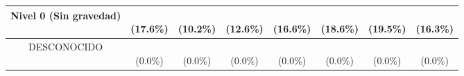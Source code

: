 \begin{table}[htbp]
\begin{tabular}{|c|c|c|c|c|c|c|c|}
\parbox[t]{4.0cm}{\raggedright Nivel 0 (Sin gravedad)} & \parbox[t]{1.2cm}{\\(17.6\%)} & \parbox[t]{1.2cm}{\\(10.2\%)} & \parbox[t]{1.2cm}{\\(12.6\%)} & \parbox[t]{1.2cm}{\\(16.6\%)} & \parbox[t]{1.2cm}{\\(18.6\%)} & \parbox[t]{1.2cm}{\\(19.5\%)} & \parbox[t]{1.6cm}{\\(16.3\%)} \\ \hline
\parbox[t]{4.0cm}{\raggedright DESCONOCIDO} & \parbox[t]{1.2cm}{\\(0.0\%)} & \parbox[t]{1.2cm}{\\(0.0\%)} & \parbox[t]{1.2cm}{\\(0.0\%)} & \parbox[t]{1.2cm}{\\(0.0\%)} & \parbox[t]{1.2cm}{\\(0.0\%)} & \parbox[t]{1.2cm}{\\(0.0\%)} & \parbox[t]{1.6cm}{\\(0.0\%)} \\ \hline
\end{tabular}
\end{table}


